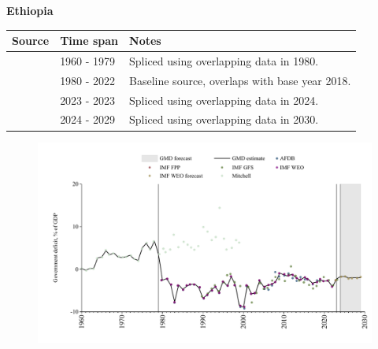 \documentclass[12pt,a4paper,landscape]{article}
\begin{document}
\begin{adjustbox}{max totalsize={\paperwidth}{\paperheight},center}
\begin{minipage}[t][\textheight][t]{\textwidth}
\vspace*{0.5cm}
{}
\begin{center}
{\Large\bfseries Ethiopia}
\end{center}
\vspace{0.5cm}
\begin{table}[H]
\centering
\small
\begin{tabular}{|l|l|l|}
\hline
\textbf{Source} & \textbf{Time span} & \textbf{Notes} \\
\hline
\rowcolor{white}\cite{Mitchell}& 1960 - 1979 &Spliced using overlapping data in 1980.\\
\rowcolor{lightgray}\cite{IMF_WEO}& 1980 - 2022 &Baseline source, overlaps with base year 2018.\\
\rowcolor{white}\cite{IMF_GFS}& 2023 - 2023 &Spliced using overlapping data in 2024.\\
\rowcolor{lightgray}\cite{IMF_WEO_forecast}& 2024 - 2029 &Spliced using overlapping data in 2030.\\
\hline
\end{tabular}
\end{table}
\begin{figure}[H]
\centering
\includegraphics[width=\textwidth,height=0.6\textheight,keepaspectratio]{graphs/ETH_govdef_GDP.pdf}
\end{figure}
\end{minipage}
\end{adjustbox}
\end{document}
